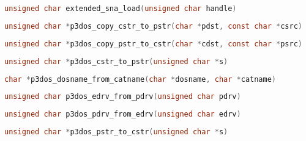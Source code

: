 \documentclass[11pt]{book}
\def\lthtmlcheckvsize{\ifdim\ht\sizebox<\vsize 
  \ifdim\wd\sizebox<\hsize\expandafter\hfill\fi \expandafter\vfill
  \else\expandafter\vss\fi}%
\begin{document}
{\newpage\clearpage
{}%
\begin{lstlisting}[language=C]
unsigned char extended_sna_load(unsigned char handle)
\end{lstlisting}%
\lthtmlfigureZ
\lthtmlcheckvsize\clearpage}

{\newpage\clearpage
{}%
\begin{lstlisting}[language=C]
unsigned char *p3dos_copy_cstr_to_pstr(char *pdst, const char *csrc)
\end{lstlisting}%
\lthtmlfigureZ
\lthtmlcheckvsize\clearpage}

{\newpage\clearpage
{}%
\begin{lstlisting}[language=C]
unsigned char *p3dos_copy_pstr_to_cstr(char *cdst, const char *psrc)
\end{lstlisting}%
\lthtmlfigureZ
\lthtmlcheckvsize\clearpage}

{\newpage\clearpage
{}%
\begin{lstlisting}[language=C]
unsigned char *p3dos_cstr_to_pstr(unsigned char *s)
\end{lstlisting}%
\lthtmlfigureZ
\lthtmlcheckvsize\clearpage}

{\newpage\clearpage
{}%
\begin{lstlisting}[language=C]
char *p3dos_dosname_from_catname(char *dosname, char *catname)
\end{lstlisting}%
\lthtmlfigureZ
\lthtmlcheckvsize\clearpage}

{\newpage\clearpage
{}%
\begin{lstlisting}[language=C]
unsigned char p3dos_edrv_from_pdrv(unsigned char pdrv)
\end{lstlisting}%
\lthtmlfigureZ
\lthtmlcheckvsize\clearpage}

{\newpage\clearpage
{}%
\begin{lstlisting}[language=C]
unsigned char p3dos_pdrv_from_edrv(unsigned char edrv)
\end{lstlisting}%
\lthtmlfigureZ
\lthtmlcheckvsize\clearpage}

{\newpage\clearpage
{}%
\begin{lstlisting}[language=C]
unsigned char *p3dos_pstr_to_cstr(unsigned char *s)
\end{lstlisting}%
\lthtmlfigureZ
\lthtmlcheckvsize\clearpage}

\appendix
{}
{\newpage\clearpage
{}%
\begin{table}\centering\tiny
  
\end{table}%
\lthtmlfigureZ
\lthtmlcheckvsize\clearpage}
\end{document}
